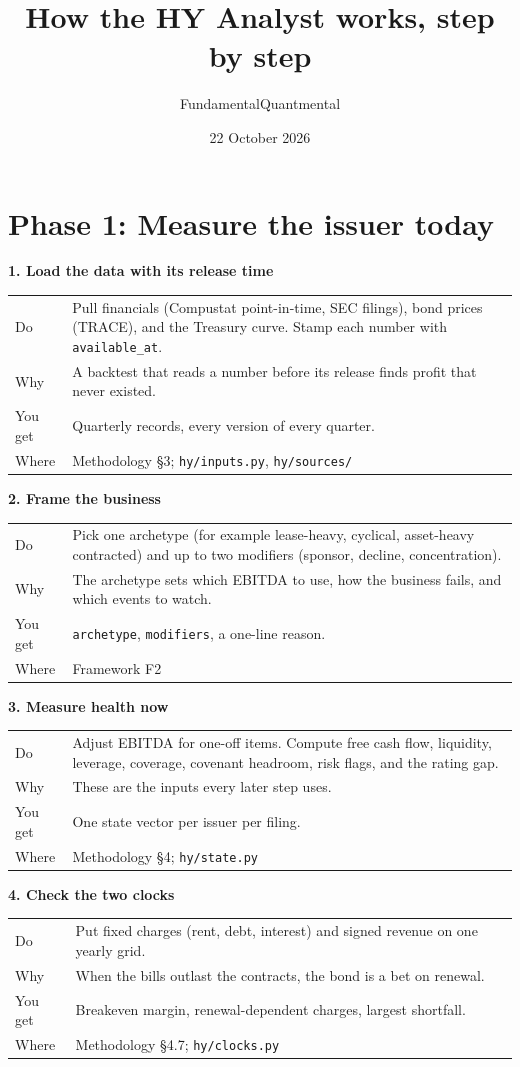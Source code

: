 \documentclass[11pt,a4paper]{article}
\title{How the HY Analyst works, step by step}
\author{FundamentalQuantmental}
\date{22 October 2026}
\makeatletter
\newcommand{\code}[1]{\texttt{\small #1}}
\newcommand{\step}[5]{%
\par\medskip\noindent\textbf{#1}\par
\noindent\begin{tabularx}{\linewidth}{@{}lX@{}}
Do & #2\\
Why & #3\\
You get & #4\\
Where & #5\\
\end{tabularx}}
\makeatother
\begin{document}
\maketitle

\noindent{}

\section*{\textcolor{ph1}{Phase 1: Measure the issuer today}}

\step{1. Load the data with its release time}
{Pull financials (Compustat point-in-time, SEC filings), bond prices (TRACE), and the Treasury curve. Stamp each number with \code{available\_at}.}
{A backtest that reads a number before its release finds profit that never existed.}
{Quarterly records, every version of every quarter.}
{Methodology \S3; \code{hy/inputs.py}, \code{hy/sources/}}

\step{2. Frame the business}
{Pick one archetype (for example lease-heavy, cyclical, asset-heavy contracted) and up to two modifiers (sponsor, decline, concentration).}
{The archetype sets which EBITDA to use, how the business fails, and which events to watch.}
{\code{archetype}, \code{modifiers}, a one-line reason.}
{Framework F2}

\step{3. Measure health now}
{Adjust EBITDA for one-off items. Compute free cash flow, liquidity, leverage, coverage, covenant headroom, risk flags, and the rating gap.}
{These are the inputs every later step uses.}
{One state vector per issuer per filing.}
{Methodology \S4; \code{hy/state.py}}

\step{4. Check the two clocks}
{Put fixed charges (rent, debt, interest) and signed revenue on one yearly grid.}
{When the bills outlast the contracts, the bond is a bet on renewal.}
{Breakeven margin, renewal-dependent charges, largest shortfall.}
{Methodology \S4.7; \code{hy/clocks.py}}
\end{document}
